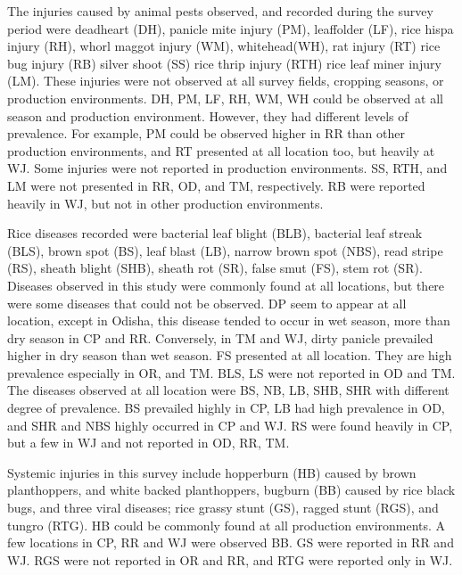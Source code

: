 The injuries caused by animal pests observed, and recorded during the survey period were deadheart (DH), panicle mite injury (PM), leaffolder (LF), rice hispa injury (RH), whorl maggot injury (WM), whitehead(WH), rat injury (RT) rice bug injury (RB) silver shoot (SS) rice thrip injury (RTH) rice leaf miner injury (LM). These injuries were not observed at all survey fields, cropping seasons, or production environments.  DH, PM, LF, RH, WM, WH could be observed at all season and production environment. However, they had different levels of prevalence. For example, PM could be observed higher in RR than other production environments, and RT presented at all location too, but heavily at WJ. Some injuries were not reported in production environments. SS, RTH, and LM were not presented in RR, OD, and TM, respectively. RB were reported heavily in WJ, but not in other production environments.  
 
Rice diseases recorded were bacterial leaf blight (BLB), bacterial leaf streak (BLS), brown spot (BS), leaf blast (LB), narrow brown spot (NBS), read stripe (RS), sheath blight (SHB), sheath rot (SR), false smut (FS), stem rot (SR). Diseases observed in this study were commonly found at all locations, but there were some diseases that could not be observed. DP seem to appear at all location, except in Odisha, this disease tended to occur in wet season, more than dry season in CP and RR. Conversely, in TM and WJ, dirty panicle prevailed higher in dry season than wet season. FS presented at all location. They are high prevalence especially in OR, and TM.  BLS, LS were not reported in OD and TM. The diseases observed at all location were BS, NB, LB, SHB, SHR with different degree of prevalence.  BS prevailed highly in CP, LB had high prevalence in OD, and SHR and NBS highly occurred in CP and WJ. RS were found heavily in CP, but a few in WJ and not reported in OD, RR, TM.

Systemic injuries in this survey include hopperburn (HB) caused by brown planthoppers, and white backed planthoppers, bugburn (BB) caused by rice black bugs, and three viral diseases; rice grassy stunt (GS), ragged stunt (RGS), and tungro (RTG). HB could be commonly found at all production environments.  A few locations in CP, RR and WJ were observed BB. GS were reported in RR and WJ. RGS were not reported in OR and RR, and RTG were reported only in WJ.


